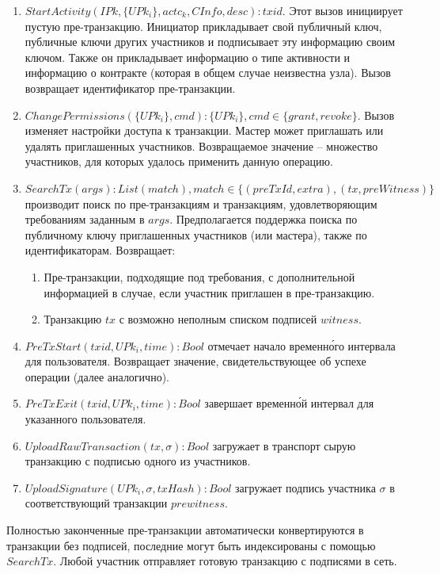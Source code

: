 \documentclass[specification,annotation]{itmo-student-thesis}
\begin{document}
\begin{enumerate}
\item $StartActivity(IPk, \{UPk_i\}, actc_k, CInfo, desc) : txid$. Этот
  вызов инициирует пустую пре-транзакцию. Инициатор прикладывает свой
  публичный ключ, публичные ключи других участников и подписывает эту
  информацию своим ключом. Также он прикладывает информацию о типе
  активности и информацию о контракте (которая в общем случае
  неизвестна узла). Вызов возвращает идентификатор пре-транзакции.
\item $ChangePermissions(\{UPk_i\}, cmd) : \{UPk_i\}, cmd \in
  \{grant,revoke\}$. Вызов изменяет настройки доступа к
  транзакции. Мастер может приглашать или удалять приглашенных
  участников. Возвращаемое значение -- множество участников, для
  которых удалось применить данную операцию.
\item $SearchTx(args) : List(match), match \in \{(preTxId,extra),
  (tx,preWitness)\}$ производит поиск по пре-транзакциям и транзакциям,
  удовлетворяющим требованиям заданным в $args$. Предполагается
  поддержка поиска по публичному ключу приглашенных участников (или
  мастера), также по идентификаторам. Возвращает:
  \begin{enumerate}
  \item Пре-транзакции, подходящие под требования, с дополнительной
    информацией в случае, если участник приглашен в пре-транзакцию.
  \item Транзакцию $tx$ с возможно неполным списком подписей $witness$.
  \end{enumerate}
\item $PreTxStart(txid, UPk_i, time) : Bool$ отмечает начало
  временн\'{о}го интервала для пользователя. Возвращает значение,
  свидетельствующее об успехе операции (далее аналогично).
\item $PreTxExit(txid, UPk_i, time) : Bool$ завершает временн\'{о}й
  интервал для указанного пользователя.
\item $UploadRawTransaction(tx, \sigma) : Bool$ загружает в транспорт
  сырую транзакцию с подписью одного из участников.
\item $UploadSignature(UPk_i, \sigma, txHash) : Bool$ загружает
  подпись участника $\sigma$ в соответствующий транзакции
  $prewitness$.
\end{enumerate}

Полностью законченные пре-транзакции автоматически конвертируются в
транзакции без подписей, последние могут быть индексированы с помощью
$SearchTx$. Любой участник отправляет готовую транзакцию с подписями в
сеть.
\end{document}
